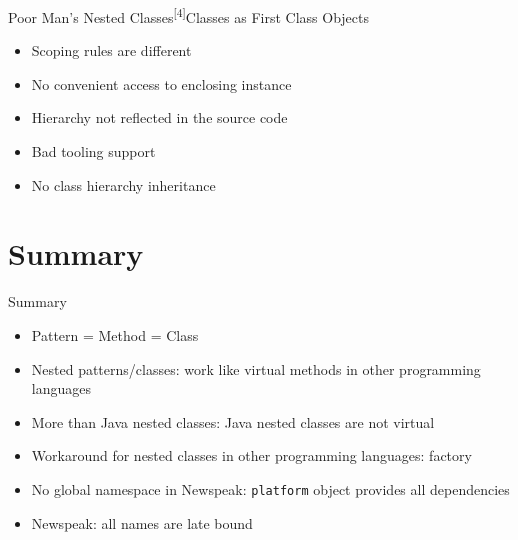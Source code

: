 \documentclass[xcolor=dvipsname, handout]{beamer} %
\begin{document}
\begin{frame}{Poor Man's Nested Classes\textsuperscript{[4]}}{Classes as First Class Objects}
\begin{itemize}
  \item Scoping rules are different
  \item No convenient access to enclosing instance
  \item Hierarchy not reflected in the source code
  \item Bad tooling support
  \item No class hierarchy inheritance
\end{itemize}
\end{frame}

%
%

\section{Summary}
\begin{frame}{Summary}
\begin{itemize}
  \item Pattern = Method = Class
  \item Nested patterns/classes: work like virtual methods in other programming languages
  \item More than Java nested classes: Java nested classes are not virtual
  \item Workaround for nested classes in other programming languages: factory
  \item No global namespace in Newspeak: \lstinline{platform} object provides all dependencies
  \item Newspeak: all names are late bound
\end{itemize}
\end{frame}
\end{document}
